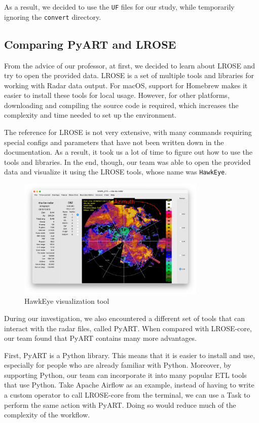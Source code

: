 As a result, we decided to use the \texttt{UF} files for our study, while temporarily ignoring the \texttt{convert} directory.


\subsection{Comparing PyART and LROSE}
From the advice of our professor, at first, we decided to learn about LROSE and try to open the provided data.
LROSE is a set of multiple tools and libraries for working with Radar data output.
For macOS, support for Homebrew makes it easier to install these tools for local usage.
However, for other platforms, downloading and compiling the source code is required,
which increases the complexity and time needed to set up the environment.

The reference for LROSE is not very extensive, with many commands requiring special configs and parameters that have not been written down
in the documentation. As a result, it took us a lot of time to figure out how to use the tools and libraries. In the end, though,
our team was able to open the provided data and visualize it using the LROSE tools, whose name was \texttt{HawkEye}.

\begin{figure}[H]
    \centering
    \includegraphics[width=0.8\textwidth]{Images/3.5-hawk-eye.png}
    \caption{HawkEye visualization tool}
    \label{fig:hawkeye}
\end{figure}

During our investigation, we also encountered a different set of tools that can interact with the radar files, called PyART.
When compared with LROSE-core, our team found that PyART contains many more advantages.

First, PyART is a Python library.
This means that it is easier to install and use, especially for people who are already familiar with Python.
Moreover, by supporting Python, our team can incorporate it into many popular ETL tools that use Python.
Take Apache Airflow as an example, instead of having to write a custom operator to call LROSE-core from the terminal,
we can use a Task to perform the same action with PyART. Doing so would reduce much of the complexity of the workflow.

